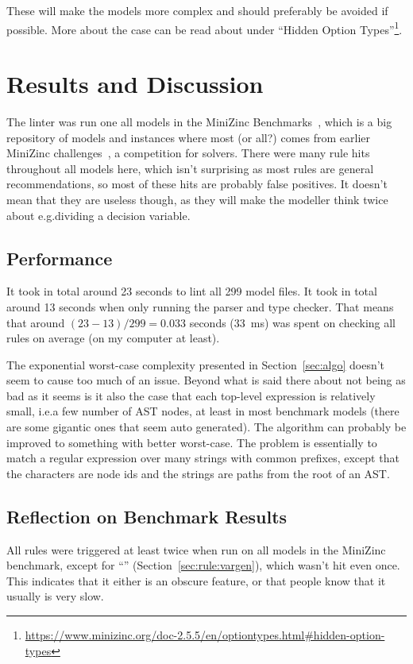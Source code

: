 \documentclass[a4paper,12pt]{article}
\newcommand{\mi}[1]{\mbox{\mzninline{#1}}}
\newcommand{\ruleref}[1]{``\nameref{sec:rule:#1}'' (Section~\ref{sec:rule:#1})}
\begin{document}
These will make the models more complex and should preferably be avoided if possible.
More about the \mi{where} case can be read about under ``Hidden Option
Types''\footnote{\label{foot:hidden:opt}\url{https://www.minizinc.org/doc-2.5.5/en/optiontypes.html\#hidden-option-types}}.

\section{Results and Discussion}\label{sec:resultat}
The linter was run one all models in the MiniZinc Benchmarks~\cite{mznbench}, which is a
big repository of models and instances where most (or all?) comes from earlier MiniZinc
challenges~\cite{MZN:Challenge}, a competition for solvers.
There were many rule hits throughout all models here, which isn't surprising as most rules
are general recommendations, so most of these hits are probably false positives. It
doesn't mean that they are useless though, as they will make the modeller think twice
about e.g.\@ dividing a decision variable.

\subsection{Performance}
It took in total around 23 %
seconds to lint all 299 model files. It took in total around 13 seconds when only running
the parser and type checker. That means that around $(23-13)/299 = 0.033$ seconds
(\SI{33}{\milli\second}) was spent on checking all rules on average (on my computer at least). %

The exponential
worst-case complexity presented in Section~\ref{sec:algo} doesn't seem to cause too much
of an issue. Beyond what is said there about not being as bad as it seems is it also the
case that each top-level expression is relatively small, i.e.\@ a few number
of AST nodes, at least in most benchmark models (there are some gigantic ones that seem
auto generated). The algorithm can probably be improved to something with better
worst-case. The problem is essentially to match a regular expression over many strings
with common prefixes, except that the characters are node ids and the strings are paths
from the root of an AST.

\subsection{Reflection on Benchmark Results}%
All rules were triggered at least twice when run on all models in the MiniZinc benchmark,
except for \ruleref{vargen}, which wasn't hit even once. This indicates that it
either is an obscure feature, or that people know that it usually is very slow.
\end{document}
